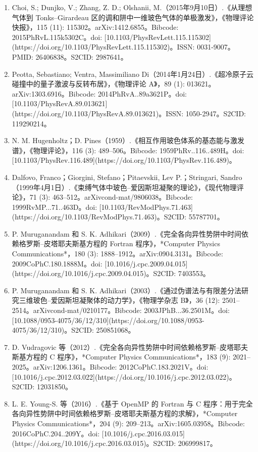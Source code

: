 \begin{enumerate}
\item Choi, S.; Dunjko, V.; Zhang, Z. D.; Olshanii, M.（2015年9月10日）.《从理想气体到 Tonks–Girardeau 区的调和阱中一维玻色气体的单极激发》，《物理评论快报》，115 (11): 115302。arXiv:1412.6855。Bibcode: 2015PhRvL.115k5302C。doi: [10.1103/PhysRevLett.115.115302](https://doi.org/10.1103/PhysRevLett.115.115302)。ISSN: 0031-9007。PMID: 26406838。S2CID: 2987641。
\item Peotta, Sebastiano; Ventra, Massimiliano Di（2014年1月24日）.《超冷原子云碰撞中的量子激波与反转布居》，《物理评论 A》，89 (1): 013621。arXiv:1303.6916。Bibcode: 2014PhRvA..89a3621P。doi: [10.1103/PhysRevA.89.013621](https://doi.org/10.1103/PhysRevA.89.013621)。ISSN: 1050-2947。S2CID: 119290214。
\item N. M. Hugenholtz；D. Pines（1959）.《相互作用玻色体系的基态能与激发谱》，《物理评论》，116 (3): 489–506。Bibcode: 1959PhRv..116..489H。doi: [10.1103/PhysRev.116.489](https://doi.org/10.1103/PhysRev.116.489)。
\item Dalfovo, Franco；Giorgini, Stefano；Pitaevskii, Lev P.；Stringari, Sandro（1999年4月1日）.《束缚气体中玻色–爱因斯坦凝聚的理论》，《现代物理评论》，71 (3): 463–512。arXiv\:cond-mat/9806038。Bibcode: 1999RvMP...71..463D。doi: [10.1103/RevModPhys.71.463](https://doi.org/10.1103/RevModPhys.71.463)。S2CID: 55787701。
\item P. Muruganandam 和 S. K. Adhikari（2009）.《完全各向异性势阱中时间依赖格罗斯–皮塔耶夫斯基方程的 Fortran 程序》，*Computer Physics Communications*，180 (3): 1888–1912。arXiv:0904.3131。Bibcode: 2009CoPhC.180.1888M。doi: [10.1016/j.cpc.2009.04.015](https://doi.org/10.1016/j.cpc.2009.04.015)。S2CID: 7403553。
\item P. Muruganandam 和 S. K. Adhikari（2003）.《通过伪谱法与有限差分法研究三维玻色–爱因斯坦凝聚体的动力学》，《物理学杂志 B》，36 (12): 2501–2514。arXiv\:cond-mat/0210177。Bibcode: 2003JPhB...36.2501M。doi: [10.1088/0953-4075/36/12/310](https://doi.org/10.1088/0953-4075/36/12/310)。S2CID: 250851068。
\item D. Vudragovic 等（2012）.《完全各向异性势阱中时间依赖格罗斯–皮塔耶夫斯基方程的 C 程序》，*Computer Physics Communications*，183 (9): 2021–2025。arXiv:1206.1361。Bibcode: 2012CoPhC.183.2021V。doi: [10.1016/j.cpc.2012.03.022](https://doi.org/10.1016/j.cpc.2012.03.022)。S2CID: 12031850。
\item L. E. Young-S. 等（2016）.《基于 OpenMP 的 Fortran 与 C 程序：用于完全各向异性势阱中时间依赖格罗斯–皮塔耶夫斯基方程的求解》，*Computer Physics Communications*，204 (9): 209–213。arXiv:1605.03958。Bibcode: 2016CoPhC.204..209Y。doi: [10.1016/j.cpc.2016.03.015](https://doi.org/10.1016/j.cpc.2016.03.015)。S2CID: 206999817。

\end{enumerate}
